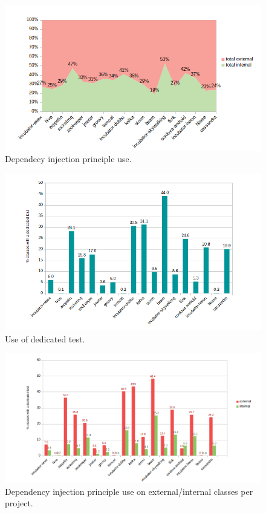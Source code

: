 \documentclass[11pt, a4paper, twocolumn]{article}
\begin{document}
\begin{figure}
    \centering
    \includegraphics[scale = 0.75]{dipuse_plot.png}
    \caption{\textsf{Dependecy injection principle use.}}
    \label{fig:dip}
\end{figure}

\begin{figure}
    \centering
    \includegraphics[scale = 0.7]{test_plot.png}
    \caption{\textsf{Use of dedicated test.}}
    \label{fig:withtest}
\end{figure}

\begin{figure}
    \centering
    \includegraphics[scale = 0.6]{test_dipuse_plot.png}
    \caption{\textsf{Dependency injection principle use on external/internal classes per project.}}
    \label{fig:dip_withtest}
\end{figure}
\end{document}
